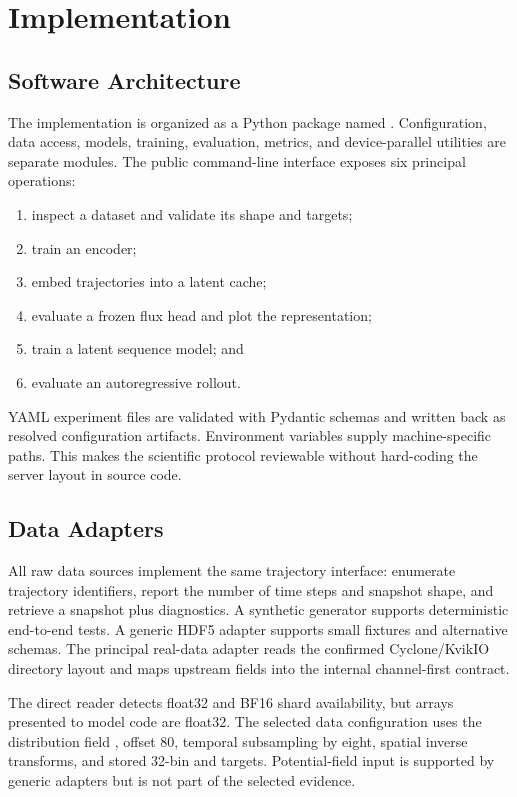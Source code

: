 \cleardoubleoddpage
\chapter{Implementation}
\label{chap:implementation}

\section{Software Architecture}

The implementation is organized as a Python package named . Configuration,
data access, models, training, evaluation, metrics, and device-parallel utilities are separate
modules. The public command-line interface exposes six principal operations:

\begin{enumerate}
  \item inspect a dataset and validate its shape and targets;
  \item train an encoder;
  \item embed trajectories into a latent cache;
  \item evaluate a frozen flux head and plot the representation;
  \item train a latent sequence model; and
  \item evaluate an autoregressive rollout.
\end{enumerate}

YAML experiment files are validated with Pydantic schemas and written back as resolved
configuration artifacts. Environment variables supply machine-specific paths. This makes the
scientific protocol reviewable without hard-coding the server layout in source code.

\section{Data Adapters}

All raw data sources implement the same trajectory interface: enumerate trajectory identifiers,
report the number of time steps and snapshot shape, and retrieve a snapshot plus diagnostics. A
synthetic generator supports deterministic end-to-end tests. A generic HDF5 adapter supports small
fixtures and alternative schemas. The principal real-data adapter reads the confirmed
Cyclone/KvikIO directory layout and maps upstream fields into the internal channel-first contract.

The direct reader detects float32 and BF16 shard availability, but arrays presented to model code
are float32. The selected data configuration uses the distribution field , offset 80,
temporal subsampling by eight, spatial inverse transforms, and stored 32-bin  and
 targets. Potential-field input is supported by generic adapters but is not part of
the selected evidence.

